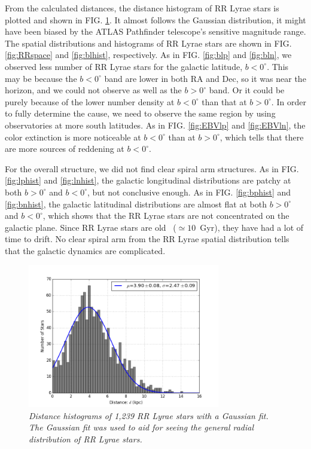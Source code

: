 \documentclass[aps,prb,twocolumn,superscriptaddress]{revtex4-1}
\begin{document}
From the calculated distances, the distance histogram of RR Lyrae stars is plotted and shown in FIG. \ref{fig:dhist}. It almost follows the Gaussian distribution, it might have been biased by the ATLAS Pathfinder telescope's sensitive magnitude range. The spatial distributions and histograms of RR Lyrae stars are shown in  FIG. \ref{fig:RRspace} and \ref{fig:blhist}, respectively. As in FIG. \ref{fig:blp} and \ref{fig:bln}, we observed less number of RR Lyrae stars for the galactic latitude, $b<0^{\circ}$. This may be because the $b<0^{\circ}$ band are lower in both RA and Dec, so it was near the horizon, and we could not observe as well as the $b>0^{\circ}$ band. Or it could be purely because of the lower number density at $b<0^{\circ}$ than that at $b>0^{\circ}$. In order to fully determine the cause, we need to observe the same region by using observatories at more south latitudes. As in FIG. \ref{fig:EBVlp} and \ref{fig:EBVln}, the color extinction is more noticeable at $b<0^{\circ}$ than at $b>0^{\circ}$, which tells that there are more sources of reddening at $b<0^{\circ}$.

\indent For the overall structure, we did not find clear spiral arm structures. As in FIG. \ref{fig:lphist} and \ref{fig:lnhist}, the galactic longitudinal distributions are patchy at both $b>0^{\circ}$ and $b<0^{\circ}$, but not conclusive enough.  As in FIG. \ref{fig:bphist} and \ref{fig:bnhist}, the galactic latitudinal distributions are almost flat at both $b>0^{\circ}$ and $b<0^{\circ}$, which shows that the RR Lyrae stars are not concentrated on the galactic plane. Since RR Lyrae stars are old~\cite{Astro} ($\simeq 10$~Gyr), they have had a lot of time to drift. No clear spiral arm from the RR Lyrae spatial distribution tells that the galactic dynamics are complicated.




\begin{figure}[H]
 \centering
 	\includegraphics[width=3.3in]{figures/PlotsSpace15/gdhist_limit15.png}
 \caption{\it \small{Distance histograms of 1,239 RR Lyrae stars with a Gaussian fit. The Gaussian fit was used to aid for seeing the general radial distribution of RR Lyrae stars. }} 
 \label{fig:dhist}
\end{figure} 
\end{document}
